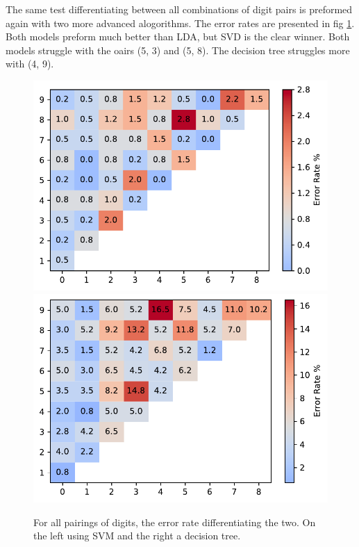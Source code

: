 \documentclass{article}
\begin{document}
    The same test differentiating between all combinations of digit pairs is
    preformed again with two more advanced alogorithms. The error rates are
    presented in fig \ref{fig:other_models}. Both models preform much better
    than LDA, but SVD is the clear winner. Both models struggle with the oairs
    (5, 3) and (5, 8). The decision tree struggles more with (4, 9).

    \begin{figure}[tbp]
        \centering
        \includegraphics[width=.49\textwidth]{SVC-digits_conf.pdf}
        \includegraphics[width=.49\textwidth]{DecisionTreeClassifier-digits_conf.pdf}
        \caption{\label{fig:other_models} For all pairings of digits, the error
        rate differentiating the two. On the left using SVM and the right a
        decision tree.}
    \end{figure}
\end{document}
